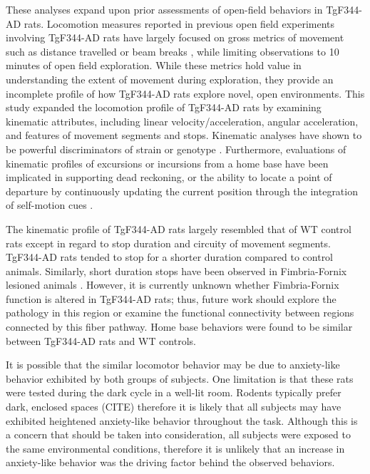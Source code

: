 \documentclass[fleqn,10pt]{wlscirep}
\begin{document}
These analyses expand upon prior assessments of open-field behaviors in TgF344-AD rats. Locomotion measures reported in previous open field experiments involving TgF344-AD rats have largely focused on gross metrics of movement such as distance travelled \cite{morrone_regional_2020,voorhees_occupational-like_2019,voorhees_-p7c3-s243_2018} or beam breaks \cite{cohen_transgenic_2013}, while limiting observations to 10 minutes of open field exploration. While these metrics hold value in understanding the extent of movement during exploration, they provide an incomplete profile of how TgF344-AD rats explore novel, open environments. This study expanded the locomotion profile of TgF344-AD rats by examining kinematic attributes, including linear velocity/acceleration, angular acceleration, and features of movement segments and stops. Kinematic analyses have shown to be powerful discriminators of strain or genotype \cite{benjamini_ten_2010}. Furthermore, evaluations of kinematic profiles of excursions or incursions from a home base have been implicated in supporting dead reckoning, or the ability to locate a point of departure by continuously updating the current position through the integration of self-motion cues \cite{wallace_fractionating_2008,wallace_movement_2006,wallace_quantification_2002}.


The kinematic profile of TgF344-AD rats largely resembled that of WT control rats except in regard to stop duration and circuity of movement segments. TgF344-AD rats tended to stop for a shorter duration compared to control animals. Similarly, short duration stops have been observed in Fimbria-Fornix lesioned animals \cite{whishaw_short-stops_1994}. However, it is currently unknown whether Fimbria-Fornix function is altered in TgF344-AD rats; thus, future work should explore the pathology in this region or examine the functional connectivity between regions connected by this fiber pathway. 
Home base behaviors were found to be similar between TgF344-AD rats and WT controls.

It is possible that the similar locomotor behavior may be due to anxiety-like behavior exhibited by both groups of subjects. One limitation is that these rats were tested during the dark cycle in a well-lit room. Rodents typically prefer dark, enclosed spaces (CITE) therefore it is likely that all subjects may have exhibited heightened anxiety-like behavior throughout the task. Although this is a concern that should be taken into consideration, all subjects were exposed to the same environmental conditions, therefore it is unlikely that an increase in anxiety-like behavior was the driving factor behind the observed behaviors. 
\end{document}
